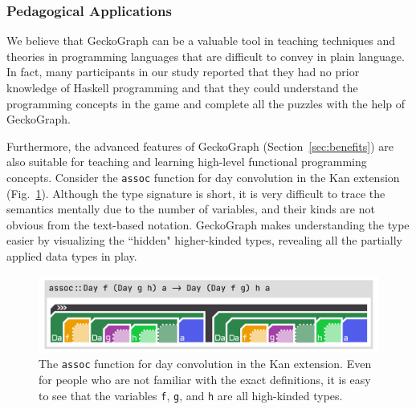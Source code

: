 \subsubsection{Pedagogical Applications}
We believe that GeckoGraph can be a valuable tool in teaching techniques and theories in programming languages that are difficult to convey in plain language. In fact, many participants in our study reported that they had no prior knowledge of Haskell programming and that they could understand the programming concepts in the game and complete all the puzzles with the help of GeckoGraph.

Furthermore, the advanced features of GeckoGraph (Section~\ref{sec:benefits}) are also suitable for teaching and learning high-level functional programming concepts. Consider the \texttt{assoc} function for day convolution \cite{Day1970-kb} in the Kan extension (Fig.~\ref{fig:assoc}). Although the type signature is short, it is very difficult to trace the semantics mentally due to the number of variables, and their kinds are not obvious from the text-based notation. GeckoGraph makes understanding the type easier by visualizing the ``hidden" higher-kinded types, revealing all the partially applied data types in play.

\begin{figure}[hbt]
  \includegraphics[width=\linewidth]{figures/assoc}
  \caption[The \texttt{assoc} function for day convolution \cite{Day1970-kb} in the Kan extension depicted in GeckoGraph]{\label{fig:assoc} The \texttt{assoc} function for day convolution \cite{Day1970-kb} in the Kan extension. Even for people who are not familiar with the exact definitions, it is easy to see that the variables \texttt{f},  \texttt{g}, and \texttt{h} are all high-kinded types.}
\end{figure}







